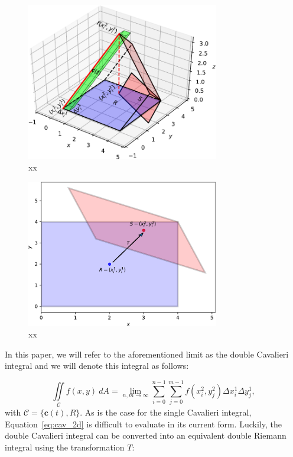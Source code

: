 \documentclass{article}
\theoremstyle{theorem}
\theoremstyle{definition}
\begin{document}
\begin{figure}[htb]
\centering
\includegraphics[width=0.75\textwidth]{prismatoid_solid.pdf}
\caption{xx}
\label{fig:prismatoid_solid}
\end{figure}

\begin{figure}[htb]
\centering
\includegraphics[width=0.75\textwidth]{prismatoid_regions.pdf}
\caption{xx}
\label{fig:prismatoid_regions}
\end{figure}

\noindent
In this paper, we will refer to the aforementioned limit as the double Cavalieri integral and we will denote this integral as follows:

\begin{equation}
\label{eq:cav_2d}
\iint \limits_{\mathcal{C}} f(x,y)~dA = \lim_{n,m \rightarrow \infty}  \sum_{i=0}^{n-1} \sum_{j=0}^{m-1} f(x_i^2,y_j^2) \Delta x_i^1 \Delta y_j^1,
\end{equation}
with $\mathcal{C} = \{\mathbf{c}(t),R\}$. As is the case for the single Cavalieri integral, Equation~\eqref{eq:cav_2d} is difficult to evaluate in its current form. Luckily, the double 
Cavalieri integral can be converted into an equivalent double Riemann integral using the transformation $T$:
\end{document}
